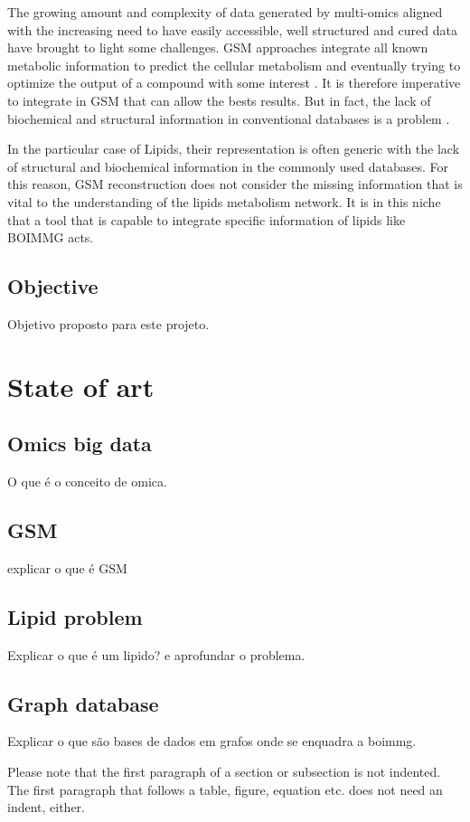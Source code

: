 \documentclass{llncs}
\begin{document}
The growing amount and complexity of data generated by multi-omics aligned with the increasing need to have easily accessible, 
well structured and cured data have brought to light some challenges. GSM approaches integrate all known metabolic information to predict the cellular metabolism and eventually 
trying to optimize the output of a compound with some interest \cite{article3,article5}. It is therefore imperative to integrate in GSM  that can allow the bests results.
But in fact, the lack of biochemical and structural information in conventional databases is a problem \cite{article5}. 

In the particular case of Lipids, their representation is often generic with the lack of structural and biochemical 
information in the commonly used databases\cite{article6}. For this reason, GSM reconstruction does not consider the missing information that is vital to the understanding of the lipids metabolism network.
It is in this niche that a tool that is capable to integrate specific information of lipids like BOIMMG acts.




\subsection{Objective}
Objetivo proposto para este projeto.
\section{State of art}
\subsection{Omics big data}
O que é o conceito de omica.
\subsection{GSM}
explicar o que é GSM
\subsection{Lipid problem}
Explicar o que é um lipido? e aprofundar o problema.
\subsection{Graph database}
Explicar o que são bases de dados em grafos onde se enquadra a boimmg.

Please note that the first paragraph of a section or subsection is
not indented. The first paragraph that follows a table, figure,
equation etc. does not need an indent, either.
\end{document}
